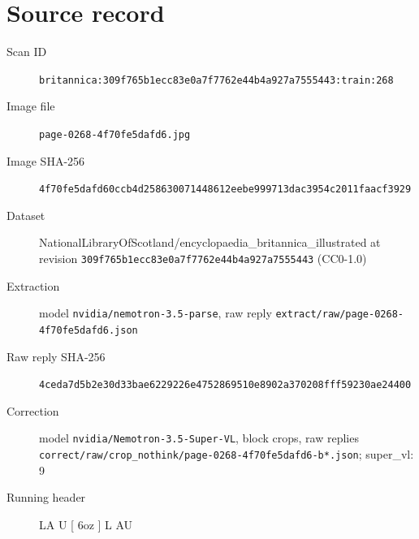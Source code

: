 \documentclass{article}
\begin{document}
\section*{Source record}
\begin{description}
\item[Scan ID] \texttt{britannica:309f765b1ecc83e0a7f7762e44b4a927a7555443:train:268}
\item[Image file] \texttt{page-0268-4f70fe5dafd6.jpg}
\item[Image SHA-256] \texttt{4f70fe5dafd60ccb4d258630071448612eebe999713dac3954c2011faacf3929}
\item[Dataset] NationalLibraryOfScotland/encyclopaedia\_britannica\_illustrated at revision \texttt{309f765b1ecc83e0a7f7762e44b4a927a7555443} (CC0-1.0)
\item[Extraction] model \texttt{nvidia/nemotron-3.5-parse}, raw reply \texttt{extract/raw/page-0268-4f70fe5dafd6.json}
\item[Raw reply SHA-256] \texttt{4ceda7d5b2e30d33bae6229226e4752869510e8902a370208fff59230ae24400}
\item[Correction] model \texttt{nvidia/Nemotron-3.5-Super-VL}, block crops, raw replies \texttt{correct/raw/crop\_nothink/page-0268-4f70fe5dafd6-b*.json}; super\_vl: 9
\item[Running header] LA U [ 6oz ] L AU
\end{description}
\end{document}
